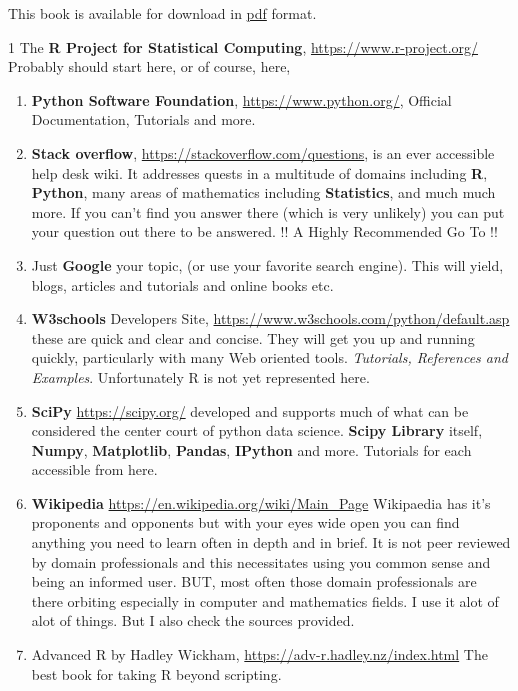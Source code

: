 \documentclass[]{book}
\theoremstyle{definition}
\theoremstyle{definition}
\theoremstyle{definition}
\theoremstyle{remark}
\begin{document}
This book is available for download in \href{RPythonBookc.pdf}{pdf}
format.

1 The \textbf{R Project for Statistical Computing},
\url{https://www.r-project.org/} Probably should start here, or of
course, here,

\begin{enumerate}
\def\labelenumi{\arabic{enumi}.}
\setcounter{enumi}{1}
\item
  \textbf{Python Software Foundation}, \url{https://www.python.org/},
  Official Documentation, Tutorials and more.
\item
  \textbf{Stack overflow}, \url{https://stackoverflow.com/questions}, is
  an ever accessible help desk wiki. It addresses quests in a multitude
  of domains including \textbf{R}, \textbf{Python}, many areas of
  mathematics including \textbf{Statistics}, and much much more. If you
  can't find you answer there (which is very unlikely) you can put your
  question out there to be answered. !! A Highly Recommended Go To !!
\item
  Just \textbf{Google} your topic, (or use your favorite search engine).
  This will yield, blogs, articles and tutorials and online books etc.
\item
  \textbf{W3schools} Developers Site,
  \url{https://www.w3schools.com/python/default.asp} these are quick and
  clear and concise. They will get you up and running quickly,
  particularly with many Web oriented tools. \emph{Tutorials, References
  and Examples}. Unfortunately R is not yet represented here.
\item
  \textbf{SciPy} \url{https://scipy.org/} developed and supports much of
  what can be considered the center court of python data science.
  \textbf{Scipy Library} itself, \textbf{Numpy}, \textbf{Matplotlib},
  \textbf{Pandas}, \textbf{IPython} and more. Tutorials for each
  accessible from here.
\item
  \textbf{Wikipedia} \url{https://en.wikipedia.org/wiki/Main_Page}
  Wikipaedia has it's proponents and opponents but with your eyes wide
  open you can find anything you need to learn often in depth and in
  brief. It is not peer reviewed by domain professionals and this
  necessitates using you common sense and being an informed user. BUT,
  most often those domain professionals are there orbiting especially in
  computer and mathematics fields. I use it alot of alot of things. But
  I also check the sources provided.
\item
  Advanced R by Hadley Wickham, \url{https://adv-r.hadley.nz/index.html}
  The best book for taking R beyond scripting.
\end{enumerate}

\printindex
\end{document}
